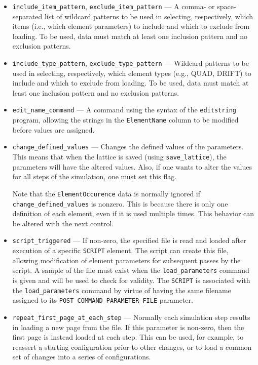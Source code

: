 \documentclass[11pt]{article}
\begin{document}
\begin{itemize}
\item \verb|include_item_pattern|, \verb|exclude_item_pattern| ---
A comma- or space-separated list of wildcard patterns to be used in selecting, respectively, which items
(i.e., which element parameters) to include and which to exclude from
loading.
To be used, data must match at least one inclusion pattern and no exclusion patterns.


\item \verb|include_type_pattern|, \verb|exclude_type_pattern| ---
Wildcard patterns to be used in selecting, respectively, which element
types (e.g., QUAD, DRIFT) to include and which to exclude from
loading.
To be used, data must match at least one inclusion pattern and no exclusion patterns.

\item \verb|edit_name_command| --- A command using the syntax of the {\tt editstring} program, allowing
  the strings in the \verb|ElementName| column to be modified before values are assigned.

\item \verb|change_defined_values| --- Changes the defined values of
the parameters.  This means that when the lattice is saved (using
\verb|save_lattice|), the parameters will have the altered values.
Also, if one wants to alter the values for all steps of the simulation,
one must set this flag. 

Note that the \verb|ElementOccurence| data is normally ignored if
\verb|change_defined_values| is nonzero.  This is because there is
only one definition of each element, even if it is used multiple times.
This behavior can be altered with the next control.

\item \verb|script_triggered| --- If non-zero, the specified file is read and loaded after execution of a
  specific \verb|SCRIPT| element. The script can create this file, allowing modification of element parameters
  for subsequent passes by the script. A sample of the file must exist when the \verb|load_parameters| command is
  given and will be used to check for validity. The \verb|SCRIPT| is associated with the \verb|load_parameters|
  command by virtue of having the same filename assigned to its \verb|POST_COMMAND_PARAMETER_FILE| parameter.
  
\item \verb|repeat_first_page_at_each_step| --- Normally each simulation step results in loading a new page from
  the file. If this parameter is non-zero, then the first page is instead loaded at each step. This can be used,
  for example, to reassert a starting configuration prior to other changes, or to load a common set of changes into
  a series of configurations.


\end{itemize}
\end{document}
